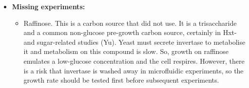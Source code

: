 \begin{itemize}
\item \textbf{Missing experiments:}
\begin{itemize}
\item Raffinose.  This is a carbon source that \cite{papagiannakisAutonomousMetabolicOscillations2017} did not use.  It is a trisaccharide and a common non-glucose pre-growth carbon source, certainly in Hxt- and sugar-related studies (Yu).  Yeast must secrete invertase to metabolise it and metabolism on this compound is slow.  So, growth on raffinose emulates a low-glucose concentration and the cell respires.  However, there is a risk that invertase is washed away in microfluidic experiments, so the growth rate should be tested first before subsequent experiments.
\end{itemize}
\end{itemize}

